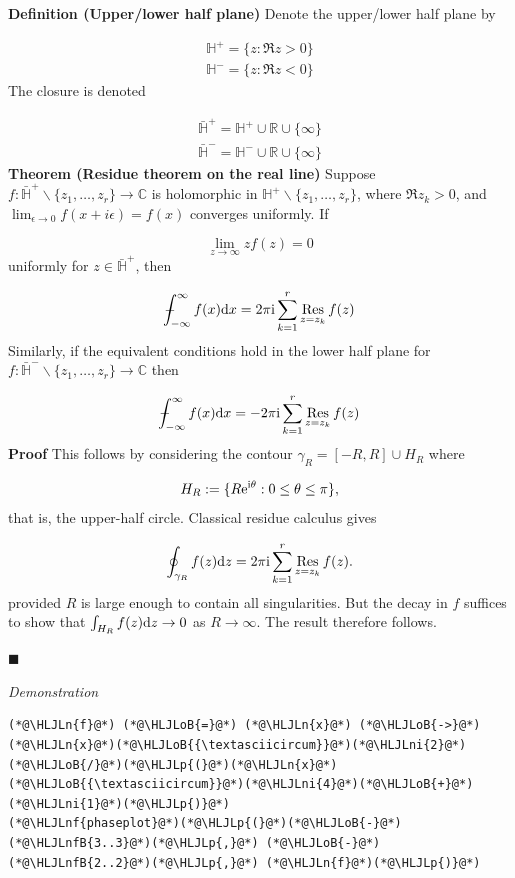 \documentclass[12pt,a4paper]{article}
\newcommand{\HLJLn}[1]{#1}
\newcommand{\HLJLnf}[1]{\textcolor[RGB]{66,102,213}{#1}}
\newcommand{\HLJLnfB}[1]{\textcolor[RGB]{59,151,46}{#1}}
\newcommand{\HLJLni}[1]{\textcolor[RGB]{59,151,46}{#1}}
\newcommand{\HLJLoB}[1]{\textcolor[RGB]{102,102,102}{\textbf{#1}}}
\newcommand{\HLJLp}[1]{#1}
\def\D{ {\rm d} }
\def\I{ {\rm i} }
\def\E{ {\rm e} }
\def\Xint#1{ \mathchoice
   {\XXint\displaystyle\textstyle{#1} }%
   {\XXint\textstyle\scriptstyle{#1} }%
   {\XXint\scriptstyle\scriptscriptstyle{#1} }%
   {\XXint\scriptscriptstyle\scriptscriptstyle{#1} }%
   \!\int}
\def\XXint#1#2#3{ {\setbox0=\hbox{$#1{#2#3}{\int}$}
     \vcenter{\hbox{$#2#3$}}\kern-.5\wd0} }
\def\dashint{\Xint-}
\def\infdashint{\dashint_{-\infty}^\infty}
\def\dx{\D x}
\def\dz{\D z}
\begin{document}
\textbf{Definition (Upper/lower half plane)} Denote the upper/lower half plane by


\begin{align*}
{\mathbb H}^+ = \{z : \Re z > 0 \}  \\
{\mathbb H}^- = \{z : \Re z < 0 \} 
\end{align*}
The closure is denoted


\begin{align*}
\bar{\mathbb H}^+ = {\mathbb H}^+ \cup {\mathbb R} \cup \{\infty\}  \\
\bar{\mathbb H}^- = {\mathbb H}^- \cup {\mathbb R} \cup \{\infty\}
\end{align*}
\textbf{Theorem (Residue theorem on the real line)} Suppose $f : \bar {\mathbb H}^+ \backslash \{z_1,\ldots,z_r \} \rightarrow {\mathbb C}$ is holomorphic in ${\mathbb H}^+ \backslash \{z_1,\ldots,z_r \}$, where $\Re z_k > 0$, and  $\lim_{\epsilon \rightarrow 0} f(x + i \epsilon) = f(x)$ converges uniformly.  If 

\[
\lim_{z \rightarrow \infty} z f(z) = 0
\]
uniformly for $z \in \bar {\mathbb H}^+$, then

\[
\infdashint f(x) \dx = 2 \pi \I \sum_{k=1}^r {\underset{z = z_k}{\rm Res}} \, f(z)
\]
Similarly, if the equivalent conditions hold in the lower half plane for $f : \bar{\mathbb H}^- \backslash \{z_1,\ldots,z_r \} \rightarrow {\mathbb C}$ then

\[
\infdashint f(x) \dx = -2 \pi \I \sum_{k=1}^r {\underset{z = z_k}{\rm Res}} \, f(z)
\]
\textbf{Proof}  This follows by considering  the contour $\gamma_R = [-R,R] \cup H_R$ where 

\[
H_R := \{ R \E^{\I \theta} : 0 \leq \theta \leq \pi \},
\]
that is, the upper-half circle. Classical residue calculus gives

\[
\oint_{\gamma_R} f(z) \dz =  2\pi \I \sum_{k=1}^r {\underset{z = z_k}{\rm Res}} \, f(z).
\]
provided $R$ is large enough to contain all singularities. But the decay in $f$ suffices to show that $\int_{H_R} f(z) \D z \rightarrow 0$ as $R \rightarrow \infty$.  The result therefore follows.

\ensuremath{\blacksquare}

\emph{Demonstration}


\begin{lstlisting}
(*@\HLJLn{f}@*) (*@\HLJLoB{=}@*) (*@\HLJLn{x}@*) (*@\HLJLoB{->}@*) (*@\HLJLn{x}@*)(*@\HLJLoB{{\textasciicircum}}@*)(*@\HLJLni{2}@*)(*@\HLJLoB{/}@*)(*@\HLJLp{(}@*)(*@\HLJLn{x}@*)(*@\HLJLoB{{\textasciicircum}}@*)(*@\HLJLni{4}@*)(*@\HLJLoB{+}@*)(*@\HLJLni{1}@*)(*@\HLJLp{)}@*)
(*@\HLJLnf{phaseplot}@*)(*@\HLJLp{(}@*)(*@\HLJLoB{-}@*)(*@\HLJLnfB{3..3}@*)(*@\HLJLp{,}@*) (*@\HLJLoB{-}@*)(*@\HLJLnfB{2..2}@*)(*@\HLJLp{,}@*) (*@\HLJLn{f}@*)(*@\HLJLp{)}@*)
\end{lstlisting}
\end{document}
